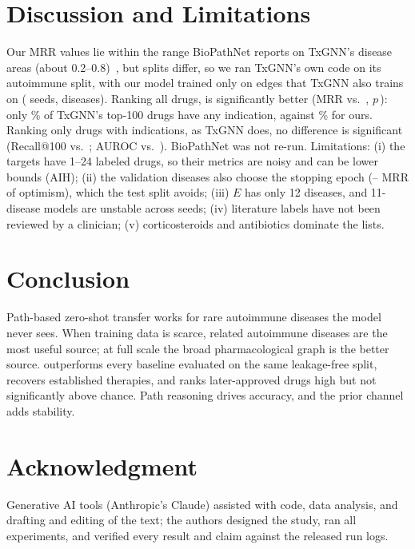\documentclass[conference]{IEEEtran}
\begin{document}
\section{Discussion and Limitations}
Our MRR values lie within the range BioPathNet reports on TxGNN's disease areas (about 0.2--0.8)~\cite{hu2026biopathnet}, but splits differ, so we ran TxGNN's own code on its autoimmune split, with our model trained only on edges that TxGNN also trains on (\TxhSeedsTx{} seeds, \TxhN{} diseases). Ranking all drugs, \sysname is significantly better (MRR \TxhOursMrr{} vs.\ \TxhTxMrr, $p$\,\TxhPwilFullMrr): only \TxhTxIndShare\% of TxGNN's top-100 drugs have any indication, against \TxhOursIndShare\% for ours. Ranking only drugs with indications, as TxGNN does, no difference is significant (Recall@100 \TxhOursRecall{} vs.\ \TxhTxRecall; AUROC \TxhOursAuroc{} vs.\ \TxhTxAuroc). BioPathNet was not re-run.
Limitations: (i) the targets have 1--24 labeled drugs, so their metrics are noisy and can be lower bounds (AIH); (ii) the validation diseases also choose the stopping epoch (\SelGapMainMin--\SelGapMainMax{} MRR of optimism), which the test split avoids; (iii) $E$ has only 12 diseases, and 11-disease models are unstable across seeds; (iv) literature labels have not been reviewed by a clinician; (v) corticosteroids and antibiotics dominate the lists.

\section{Conclusion}
Path-based zero-shot transfer works for rare autoimmune diseases the model never sees. When training data is scarce, related autoimmune diseases are the most useful source; at full scale the broad pharmacological graph is the better source. \sysname outperforms every baseline evaluated on the same leakage-free split, recovers established therapies, and ranks later-approved drugs high but not significantly above chance. Path reasoning drives accuracy, and the prior channel adds stability.

\section*{Acknowledgment}
Generative AI tools (Anthropic's Claude) assisted with code, data analysis, and drafting and editing of the text; the authors designed the study, ran all experiments, and verified every result and claim against the released run logs.



\end{document}
